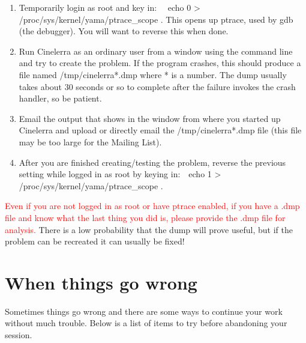 \begin{enumerate}[nosep]
	\item Temporarily login as root and key in: \ \ echo 0 {\textgreater} /proc/sys/kernel/yama/ptrace\_scope . This opens up ptrace, used by gdb (the debugger). You will want to reverse this when done.
	\item Run Cinelerra as an ordinary user from a window using the command line and try to create the problem. If the program crashes, this should produce a file named /tmp/cinelerra*.dmp where * is a number. The dump usually takes about 30 seconds or so to complete after the failure invokes the crash handler, so be patient. 
	\item Email the output that shows in the window from where you started up Cinelerra and upload or directly email the /tmp/cinelerra*.dmp file (this file may be too large for the Mailing List).
	\item After you are finished creating/testing the problem, reverse the previous setting while logged in as root by keying in:\ \ echo 1 {\textgreater} /proc/sys/kernel/yama/ptrace\_scope .
\end{enumerate}

\textcolor{red}{Even if you are not logged in as root or have ptrace enabled, if you
have a .dmp file and know what the last thing you did is, please provide the .dmp file for analysis.} There is a low
probability that the dump will prove useful, but if the problem can be recreated it can usually be fixed!

\section{When things go wrong}%
\label{cha:When things go wrong}
Sometimes things go wrong and there are some ways to continue your work without much trouble. Below is a list of items
to try before abandoning your session.

